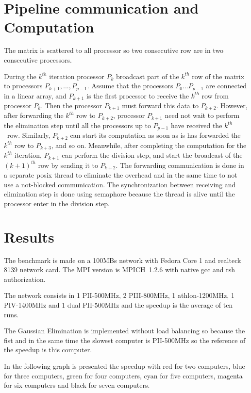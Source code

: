 \documentclass[a4paper]{article}
\begin{document}
\section{Pipeline communication and Computation}

\bigskip The matrix is scattered to all processor so two consecutive row are
in two consecutive processors.

During the $k^{th}$ iteration processor $P_{k}$ broadcast part of the $%
k^{th} $ row of the matrix to processors $P_{k+1},...,P_{p-1}$. Assume that
the processors $P_{0}...P_{p-1}$ are connected in a linear array, and $%
P_{k+1}$ is the first processor to receive the $k^{th}$ row from processor $%
P_{k}$. Then the processor $P_{k+1}$ must forward this data to $P_{k+2}$.
However, after forwarding the $k^{th}$ row to $P_{k+2}$, processor $P_{k+1}$
need not wait to perform the elimination step until all the processors up to 
$P_{p-1}$ have received the $k^{th}\,$\ row. Similarly, $P_{k+2}$ can start
its computation as soon as is has forwarded the $k^{th}$ row to $P_{k+3}$,
and so on. Meanwhile, after completing the computation for the $k^{th}$
iteration, $P_{k+1}$ can perform the division step, and start the broadcast
of the $(k+1)^{th}$ row by sending it to $P_{k+2}$. The forwarding
communication is done in a separate posix thread to eliminate the overhead
and in the same time to not use a not-blocked communication. The
synchronization between receiving and elimination step is done using
semaphore because the thread is alive until the processor enter in the
division step.

\section{\protect\bigskip Results}

The benchmark is made on a 100MBs network with Fedora Core 1 and realteck
8139 network card. The MPI version is MPICH\ 1.2.6 with native gcc and rsh
authorization.

The network consists in 1 PII-500MHz, 2 PIII-800MHz, 1 athlon-1200MHz, 1
PIV-1400MHz and 1 dual PII-500MHz and the speedup is the average of ten runs.

The Gaussian Elimination is implemented without load balancing so because
the fist and in the same time the slowest computer is PII-500MHz so the
reference of the speedup is this computer.

In the following graph is presented the speedup with red for two computers,
blue for three computers, green for four computers, cyan for five computers,
magenta for six computers and black for seven computers.

\begin{center}
\end{center}
\end{document}
